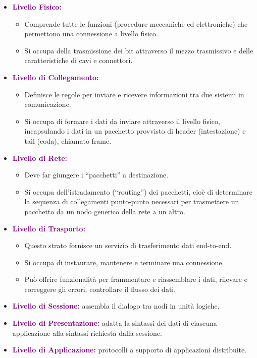 \begin{itemize}
    \item \textbf{\textcolor{purple}{Livello Fisico:}} 
        \begin{itemize}
        \item Comprende tutte le funzioni (procedure meccaniche ed elettroniche) che permettono una connessione a livello fisico.
        \item Si occupa della trasmissione dei bit attraverso il mezzo trasmissivo e delle caratteristiche di cavi e connettori.
        \end{itemize}
    \item \textbf{\textcolor{purple}{Livello di Collegamento:}} 
        \begin{itemize}
            \item Definisce le regole per inviare e ricevere informazioni tra due sistemi in comunicazione.
            \item Si occupa di formare i dati da inviare attraverso il livello fisico, incapsulando i dati in un pacchetto provvisto di header (intestazione) e tail (coda), chiamato frame.
        \end{itemize}
    \item \textbf{\textcolor{purple}{Livello di Rete:}}
        \begin{itemize}
            \item Deve far giungere i “pacchetti” a destinazione.
            \item Si occupa dell’istradamento (“routing”) dei pacchetti, cioè di determinare la sequenza di collegamenti punto-punto necessari per trasmettere un pacchetto da un nodo generico della rete a un altro.
        \end{itemize}
    \item \textbf{\textcolor{purple}{Livello di Trasporto:}}    
        \begin{itemize}
            \item Questo strato fornisce un servizio di trasferimento dati end-to-end.
            \item Si occupa di instaurare, mantenere e terminare una connessione.
            \item Può offrire funzionalità per frammentare e riassemblare i dati, rilevare e correggere gli errori, controllare il flusso dei dati.
        \end{itemize}
    \item \textbf{\textcolor{purple}{Livello di Sessione:}} assembla il dialogo tra nodi in unità logiche.
    \item \textbf{\textcolor{purple}{Livello di Presentazione:}} adatta la sintassi dei dati di ciascuna applicazione alla sintassi richiesta dalla sessione.
    \item \textbf{\textcolor{purple}{Livello di Applicazione:}} protocolli a supporto di applicazioni distribuite.
\end{itemize}

